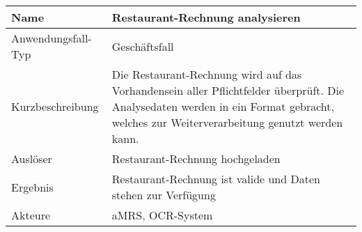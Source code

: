 \begin{table}[H]
    \centering
    \label{}
    \begin{tabularx}{\textwidth}{| l | X |}
        \hline
        Name               & Restaurant-Rechnung analysieren                                                                                                                                                       \\
        \hline
        Anwendungsfall-Typ & Geschäftsfall                                                                                                                                                                         \\
        \hline
        Kurzbeschreibung   & Die Restaurant-Rechnung wird auf das Vorhandensein aller Pflichtfelder überprüft. Die Analysedaten werden in ein Format gebracht, welches zur Weiterverarbeitung genutzt werden kann. \\
        \hline
        Auslöser           & Restaurant-Rechnung hochgeladen                                                                                                                                                       \\
        \hline
        Ergebnis           & Restaurant-Rechnung ist valide und Daten stehen zur Verfügung                                                                                                                         \\
        \hline
        Akteure            & \ac{aMRS}, OCR-System                                                                                                                                                                 \\
        \hline
    \end{tabularx}
\end{table}


